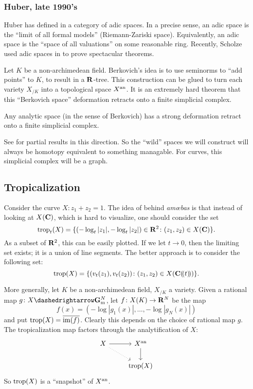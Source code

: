 \subsubsection{Huber, late 1990's}
Huber has defined in \cite{huber-1996} a category of adic spaces. In a 
precise sense, an adic 
space is the ``limit of all formal models'' (Riemann-Zariski space). 
Equivalently, an adic space is the ``space of all valuations'' on some 
reasonable ring. Recently, Scholze used adic spaces in \cite{scholze-2012} to prove 
spectacular theorems. 


Let $K$ be a non-archimedean field. Berkovich's idea is to use seminorms 
to ``add points'' to $K$, to result in a $\mathbf{R}$-tree. This construction 
can be glued to turn each variety $X_{/K}$ into a topological space 
$X^{\mathrm{an}}$. It is an extremely 
hard theorem that this ``Berkovich space'' deformation retracts onto a 
finite simplicial complex. 

\begin{theorem}
Any analytic space (in the sense of Berkovich) has a strong deformation retract 
onto a finite simplicial complex. 
\end{theorem}

See \cite{berkovich-1999,thuillier-2007} for partial results in this direction. 
So the ``wild'' spaces we will construct will always be homotopy equivalent to 
something managable. For curves, this simplicial complex will be a graph. 





\subsection{Tropicalization}

Consider the curve $X\colon z_1+z_2=1$. The idea of behind \emph{am\oe{}bas} is that 
instead of looking at $X(\mathbf{C})$, which is hard to visualize, one should consider the 
set 
\[
  \operatorname{trop}_t(X) = \{(-\log_t|z_1|,-\log_t|z_2|)\in \mathbf{R}^2\colon (z_1,z_2)\in X(\mathbf{C})\} .
\]
As a subset of $\mathbf{R}^2$, this can be easily plotted. If we let $t\to 0$, then 
the limiting set exists; it is a union of line segments. The better approach is 
to consider the following set: 
\[
  \operatorname{trop}(X)=\{(v_t(z_1),v_t(z_2))\colon (z_1,z_2)\in X(\mathbf{C}(\!( t)\!))\} .
\]

More generally, let $K$ be a non-archimedean field, $X_{/K}$ a variety. 
Given a rational map $g\colon X\dashedrightarrow \Gm^N$, let 
$f\colon X(K)\to \mathbf{R}^N$ be the map 
\[
  f(x) = (-\log|g_1(x)|,\dots,-\log|g_N(x)|) 
\]
and put $\operatorname{trop}(X) = \overline{\operatorname{im}(f)}$. Clearly this depends on the choice 
of rational map $g$. The tropicalization map factors through the 
analytification of $X$: 
\[
\begin{tikzcd}
  X \ar[r] \ar[dr, dotted]
    & X^\an \ar[d] \\
  & \trop(X)
\end{tikzcd}
\]
So $\operatorname{trop}(X)$ is a ``snapshot'' of $X^{\mathrm{an}}$. 


